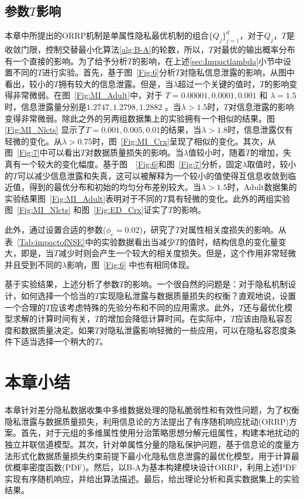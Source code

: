 \subsection{参数$T$影响}\label{sec:impactofT}
本章中所提出的ORRP机制是单属性隐私最优机制的组合$\{Q_j\}_{j=1}^{d}$，对于$Q_j$，$T$是收敛门限，控制交替最小化算法\ref{alg:B-A}的轮数，所以，$T$对最优的输出概率分布有一个直接的影响。为了给予分析$T$的影响，在上述\ref{sec:Impactlambda}小节中设置不同的$T$进行实验。首先，基于图~\ref{Fig:6}分析$T$对隐私信息泄露的影响，从图中看出，较小的$T$拥有较大的信息泄露。但是，当$\lambda$超过一个关键的值时，$T$的影响变得非常微弱。在图~\ref{Fig:MI_Adult}中，对于 $T=0.00001, 0.0001, 0.001$ 和 $\lambda=1.5$时，信息泄露量分别是$1.2747, 1.2798, 1.2882$ 。当$\lambda>1.5$时，$T$对信息泄露的影响变得非常微弱。除此之外的另两组数据集上的实验拥有一个相似的结果。图~ \ref{Fig:MI_Nlcts} 显示了$T=0.001,0.005,0.01$的结果，当$\lambda>1.8$时，信息泄露仅有轻微的变化。从$\lambda >0.75$时，图~\ref{Fig:MI_Crx}呈现了相似的变化。其次，从图~\ref{Fig:7}中可以看出$T$对数据质量损失的影响。当$\lambda$值较小时，随着$T$的增加，失真有一个较大的变化幅度。基于图~~\ref{Fig:6}和图~\ref{Fig:7}分析，固定$\lambda$取值时，较小的$T$可以减少信息泄露和失真，这可以被解释为一个较小的值使得互信息收敛到临近值，得到的最优分布和初始的均匀分布差别较大。当$\lambda >1.5$时，Adult数据集的实验结果图~\ref{Fig:MI_Adult}表明对于不同的$T$具有轻微的变化。此外的两组实验图~\ref{Fig:MI_Nlcts} 和图~\ref{Fig:ED_Crx}证实了$T$的影响。

此外，通过设置合适的参数($\phi_{c}=0.02$)，研究了$T$对属性相关度损失的影响。从表~\ref{Tab:impactofNSE}中的实验数据看出当减少$T$的值时，结构信息的变化量变大，即是，当$T$减少时则会产生一个较大的相关度损失。但是，这个作用非常轻微并且受到不同的$\lambda$影响，图~\ref{Fig:6} 中也有相同体现。

基于实验结果，上述分析了参数$T$的影响。一个很自然的问题是：对于隐私机制设计，如何选择一个恰当的$T$实现隐私泄露与数据质量损失的权衡？直观地说，设置一个合理的$T$应该考虑特殊的先验分布和不同的应用需求。此外，$T$还与最优化模型求解的计算时间有关，$T$的增加会降低计算时间。在实际中，$T$应该由隐私容忍度和数据质量决定。如果$T$对隐私泄露影响轻微的一些应用，可以在隐私容忍度条件下适当选择一个稍大的$T$。

\section{本章小结}\label{sec:chapter05-conclusion}
本章针对差分隐私数据收集中多维数据处理的隐私脆弱性和有效性问题，为了权衡隐私泄露与数据质量损失，利用信息论的方法提出了有序随机响应扰动(ORRP)方案。首先，对于元组的多维属性使用分治策略思想分解元组属性，构建本地扰动的独立并联信道模型。其次，针对单属性分量的隐私保护问题，基于信息论的度量方法形式化数据质量损失约束前提下最小化隐私信息泄露的最优化模型，用于计算最优概率密度函数(PDF)。然后，以B-A为基本构建模块设计ORRP，利用上述PDF实现有序随机响应，并给出算法描述。最后，给出理论分析和真实数据集上的实验结果。
